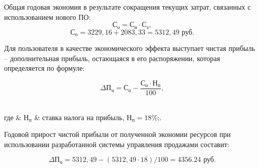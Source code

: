 Общая годовая экономия в результате сокращения текущих затрат, связанных с использованием нового ПО:
\begin{equation}
  \text{С}_\text{о} = \text{С}_\text{н} \cdot \text{С}_\text{з},
\end{equation}
\begin{equation*}
  \text{С}_\text{о} = 3229,16 + 2083,33 = 5312,49 \text{ руб.}
\end{equation*}

Для пользователя в качестве экономического эффекта выступает чистая прибыль – дополнительная прибыль, остающаяся в его
распоряжении, которая определяется по формуле:

\begin{equation}
  \Delta\text{П}_\text{ч} = \text{С}_\text{о} - \frac{\text{С}_\text{о} \cdot \text{Н}_\text{п}}{100},
\end{equation}
\\[0pt]
\begin{explanation}
  где & $ \text{Н}_\text{п} $ & ставка налога на прибыль, $ \text{Н}_\text{п} = 18\% $;.
\end{explanation}

Годовой прирост чистой прибыли от полученной экономии ресурсов при использовании разработанной системы управления
продажами составит:

\begin{equation*}
  \Delta\text{П}_\text{ч} = 5312,49 - (5312,49 \cdot 18)/100 = 4356.24 \text{ руб.}
\end{equation*}

